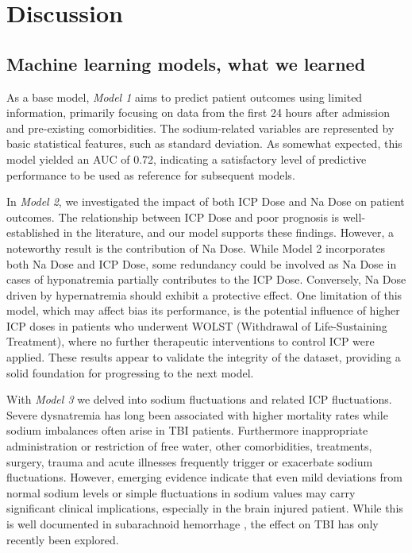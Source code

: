 \section{Discussion}

\subsection{Machine learning models, what we learned}
As a base model, \textit{Model 1} aims to predict patient outcomes using limited information, primarily focusing on data from the first 24 hours after admission and pre-existing comorbidities. The sodium-related variables are represented by basic statistical features, such as standard deviation. As somewhat expected, this model yielded an AUC of 0.72, indicating a satisfactory level of predictive performance to be used as reference for subsequent models.

In \textit{Model 2}, we investigated the impact of both ICP Dose and Na Dose on patient outcomes. The relationship between ICP Dose and poor prognosis is well-established in the literature\cite{shethIntracranialPressureDose2013}\cite{schonenberg-tuPressureTimeDose2023}\cite{cuccioliniIntracranialPressureClinicians2023a}, and our model supports these findings. However, a noteworthy result is the contribution of Na Dose. While Model 2 incorporates both Na Dose and ICP Dose, some redundancy could be involved as Na Dose in cases of hyponatremia partially contributes to the ICP Dose. Conversely, Na Dose driven by hypernatremia should exhibit a protective effect. One limitation of this model, which may affect bias its performance, is the potential influence of higher ICP doses in patients who underwent WOLST (Withdrawal of Life-Sustaining Treatment), where no further therapeutic interventions to control ICP were applied.
These results appear to validate the integrity of the dataset, providing a solid foundation for progressing to the next model.

With \textit{Model 3} we delved into sodium fluctuations and related ICP fluctuations. 
Severe dysnatremia has long been associated with higher mortality rates while sodium imbalances often arise in TBI patients. Furthermore inappropriate administration or restriction of free water, other comorbidities, treatments, surgery\cite{marshallAssociationSodiumFluctuations2017}\cite{sakrFluctuationsSerumSodium2013}, trauma and acute illnesses\cite{senSodiumVariabilityAssociated2017a} frequently trigger or exacerbate sodium fluctuations. However, emerging evidence\cite{darmonPrognosticConsequencesBorderline2013} indicate that even mild deviations from normal sodium levels or simple fluctuations in sodium values may carry significant clinical implications, especially in the brain injured patient. While this is well documented in subarachnoid hemorrhage \cite{jinAssociationSerumSodium2022}\cite{labibSodiumItsImpact2024}\cite{balesEffectHyponatremiaSodium2016}\cite{topjianGreaterFluctuationsSerum2014}\cite{eaglesSignificanceFluctuationsSerum2019}\cite{haradaImpactHormonalDynamics2022}, the effect on TBI has only recently been explored\cite{harroisVariabilitySerumSodium2021a}. 

